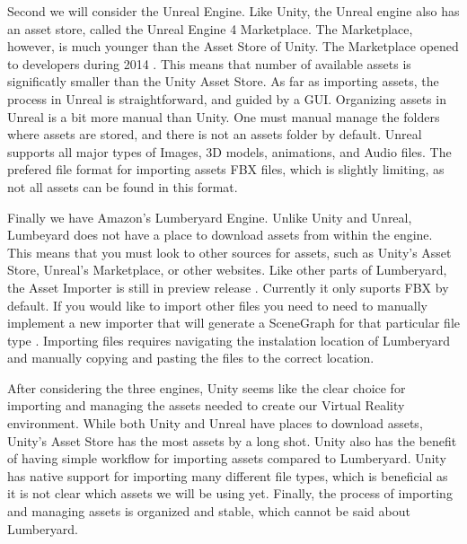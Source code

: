 \documentclass[10pt,journal,compsoc,onecolumn, draftclsnofoot]{IEEEtran}
\begin{document}
Second we will consider the Unreal Engine.
Like Unity, the Unreal engine also has an asset store, called the Unreal Engine 4 Marketplace.
The Marketplace, however, is much younger than the Asset Store of Unity.
The Marketplace opened to developers during 2014 \cite{unreal_marketplace_date}.
This means that number of available assets is significatly smaller than the Unity Asset Store.
As far as importing assets, the process in Unreal is straightforward, and guided by a GUI.
Organizing assets in Unreal is a bit more manual than Unity.
One must manual manage the folders where assets are stored, and there is not an assets folder by default.
Unreal supports all major types of Images, 3D models, animations, and Audio files.
The prefered file format for importing assets FBX files, which is slightly limiting, as not all assets can be found in this format.

Finally we have Amazon's Lumberyard Engine.
Unlike Unity and Unreal, Lumbeyard does not have a place to download assets from within the engine.
This means that you must look to other sources for assets, such as Unity's Asset Store, Unreal's Marketplace, or other websites.
Like other parts of Lumberyard, the Asset Importer is still in preview release \cite{lumberyard_asset_import}.
Currently it only suports FBX by default.
If you would like to import other files you need to need to manually implement a new importer that will generate a SceneGraph for that particular file type \cite{lumberyard_asset_import}.
Importing files requires navigating the instalation location of Lumberyard and manually copying and pasting the files to the correct location.

After considering the three engines, Unity seems like the clear choice for importing and managing the assets needed to create our Virtual Reality environment.
While both Unity and Unreal have places to download assets, Unity's Asset Store has the most assets by a long shot.
Unity also has the benefit of having simple workflow for importing assets compared to Lumberyard.
Unity has native support for importing many different file types, which is beneficial as it is not clear which assets we will be using yet.
Finally, the process of importing and managing assets is organized and stable, which cannot be said about Lumberyard.
\end{document}
